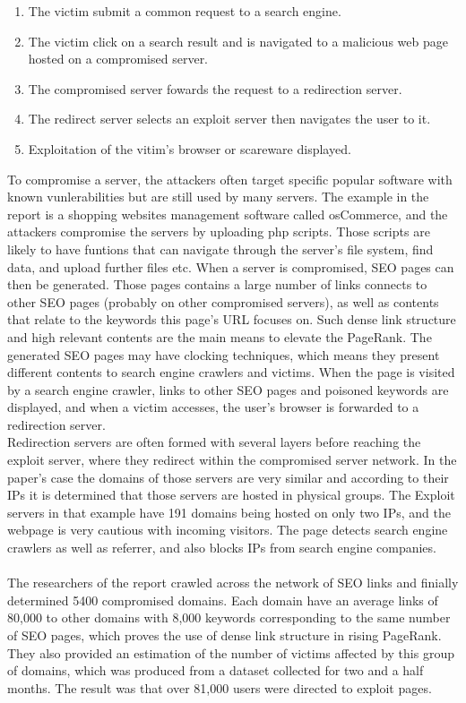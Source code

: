 \documentclass[pdftex,a4paper,12pt]{article}
\begin{document}
\begin{enumerate}
\item The victim submit a common request to a search engine.
\item The victim click on a search result and is navigated to a malicious web page hosted on a compromised server. 
\item The compromised server fowards the request to a redirection server.
\item The redirect server selects an exploit server then navigates the user to it. 
\item Exploitation of the vitim's browser or scareware displayed. 
\end{enumerate}

To compromise a server, the attackers often target specific popular software with known vunlerabilities but are still used by many servers. The example in the report is a shopping websites management software called osCommerce, and the attackers compromise the servers by uploading php scripts. Those scripts are likely to have funtions that can navigate through the server's file system, find data, and upload further files etc. When a server is compromised, SEO pages can then be generated. Those pages contains a large number of links connects to other SEO pages (probably on other compromised servers), as well as contents that relate to the keywords this page's URL focuses on. Such dense link structure and high relevant contents are the main means to elevate the PageRank. The generated SEO pages may have clocking techniques, which means they present different contents to search engine crawlers and victims. When the page is visited by a search engine crawler, links to other SEO pages and poisoned keywords are displayed, and when a victim accesses, the user's browser is forwarded to a redirection server. \\
Redirection servers are often formed with several layers before reaching the exploit server, where they redirect within the compromised server network. In the paper's case the domains of those servers are very similar and according to their IPs it is determined that those servers are hosted in physical groups. The Exploit servers in that example have 191 domains being hosted on only two IPs, and the webpage is very cautious with incoming visitors. The page detects search engine crawlers as well as referrer, and also blocks IPs from search engine companies. 
\paragraph*{}
The researchers of the report crawled across the network of SEO links and finially determined 5400 compromised domains. Each domain have an average links of 80,000 to other domains with 8,000 keywords corresponding to the same number of SEO pages, which proves the use of dense link structure in rising PageRank. They also provided an estimation of the number of victims affected by this group of domains, which was produced from a dataset collected for two and a half months. The result was that over 81,000 users were directed to exploit pages. 
\end{document}
